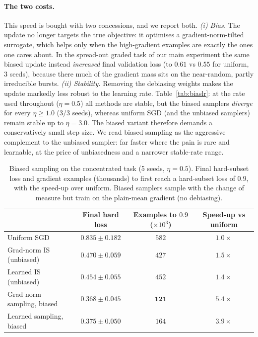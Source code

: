 \documentclass[11pt]{article}
\begin{document}
\paragraph{The two costs.} This speed is bought with two concessions, and we
report both. \emph{(i) Bias.} The update no longer targets the true objective: it
optimises a gradient-norm-tilted surrogate, which helps only when the
high-gradient examples are exactly the ones one cares about. In the spread-out
graded task of our main experiment the same biased update instead
\emph{increased} final validation loss (to $0.61$ vs $0.55$ for uniform, 3 seeds),
because there much of the gradient mass sits on the near-random, partly
irreducible bursts. \emph{(ii) Stability.} Removing the debiasing weights makes
the update markedly less robust to the learning rate. Table~\ref{tab:biaslr}: at
the rate used throughout ($\eta=0.5$) all methods are stable, but the biased
samplers \emph{diverge} for every $\eta\ge1.0$ (3/3 seeds), whereas uniform SGD
(and the unbiased samplers) remain stable up to $\eta=3.0$. The biased variant
therefore demands a conservatively small step size. We read biased sampling as the
aggressive complement to the unbiased sampler: far faster where the pain is
rare and learnable, at the price of unbiasedness and a narrower stable-rate range.

\begin{table}[t]
\centering
\caption{Biased sampling on the concentrated task (5 seeds, $\eta=0.5$). Final
hard-subset loss and gradient examples (thousands) to first reach a hard-subset
loss of $0.9$, with the speed-up over uniform. Biased samplers sample with the
change of measure but train on the plain-mean gradient (no debiasing).}
\label{tab:biased}
\small
\begin{tabular}{lccc}
\toprule
& Final hard loss & Examples to $0.9$ ($\times10^3$) & Speed-up vs uniform \\
\midrule
Uniform SGD                 & $0.835 \pm 0.182$ & $582$ & $1.0\times$ \\
Grad-norm IS (unbiased)     & $0.470 \pm 0.059$ & $427$ & $1.5\times$ \\
Learned IS (unbiased)       & $0.454 \pm 0.055$ & $452$ & $1.4\times$ \\
Grad-norm sampling, biased  & $\mathbf{0.368 \pm 0.045}$ & $\mathbf{121}$ & $\mathbf{5.4\times}$ \\
Learned sampling, biased    & $0.375 \pm 0.050$ & $164$ & $3.9\times$ \\
\bottomrule
\end{tabular}
\end{table}
\end{document}
